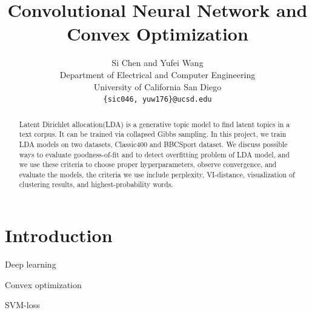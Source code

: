 \documentclass{article} %
\title{Convolutional Neural Network and Convex Optimization}
\author{
Si Chen  and   Yufei Wang\\
Department of Electrical and Computer Engineering\\
University of California San Diego\\
\texttt{\{sic046, yuw176\}@ucsd.edu}          \\
}
\begin{document}
\maketitle
\begin{abstract}
Latent Dirichlet allocation(LDA) is a generative topic model to find latent topics in a text corpus. It can be trained via collapsed Gibbs sampling. In this project, we train LDA models on two datasets, Classic400 and BBCSport dataset. We discuss possible ways to evaluate goodness-of-fit and to detect overfitting problem of LDA model, and we use these criteria to choose proper hyperparameters, observe convergence, and evaluate the models, the criteria we use include perplexity, VI-distance, visualization of clustering results, and highest-probability words. 

\end{abstract}
\section{Introduction}

Deep learning


Convex optimization


SVM-loss



\par
\end{document}
